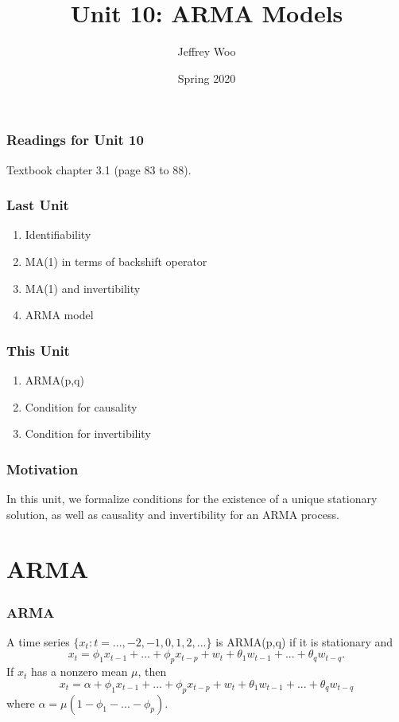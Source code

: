 \documentclass[%
xcolor=pdftex]{beamer}
\title{Unit 10: ARMA Models}
\author[STAT 5170: Applied Time Series, Unit 10]{Jeffrey Woo}
\institute{Department of Statistics, University of Virginia}
\date{Spring 2020}
\begin{document}
\frame{\titlepage}


\begin{frame}
\frametitle{Readings for Unit 10}

Textbook chapter 3.1 (page 83 to 88).

\end{frame}



\begin{frame}
\frametitle{Last Unit}
\begin{enumerate}
\item Identifiability
\item MA(1) in terms of backshift operator
\item MA(1) and invertibility
\item ARMA model
\end{enumerate}
\end{frame}

\begin{frame}
\frametitle{This Unit}
\begin{enumerate}
\item ARMA(p,q)
\item Condition for causality
\item Condition for invertibility
\end{enumerate}
\end{frame}


\begin{frame}
\frametitle{Motivation}

In this unit, we formalize conditions for the existence of a unique stationary solution, as well as causality and invertibility for an ARMA process.

\end{frame}

\section{ARMA}
\frame{\tableofcontents[currentsection]}

\begin{frame}
\frametitle{ARMA}

A time series $\{x_t: t=...,-2,-1,0,1,2,...\}$ is ARMA(p,q) if it is stationary and
\begin{equation*}
x_t=\phi_1 x_{t-1}+...+\phi_p x_{t-p}+w_t+\theta_1 w_{t-1}+...+\theta_q w_{t-q}.
\end{equation*}
If $x_t$ has a nonzero mean $\mu$, then
$$
x_t=\alpha + \phi_1 x_{t-1}+...+\phi_p x_{t-p}+w_t+\theta_1 w_{t-1}+...+\theta_q w_{t-q}
$$
where $\alpha=\mu(1-\phi_1-...-\phi_p)$.

\end{frame}
\end{document}

